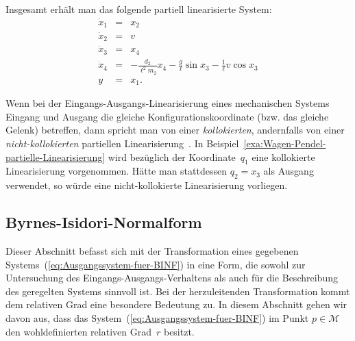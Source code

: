 \begin{example}
Insgesamt erhält man das folgende partiell linearisierte System\foreignlanguage{english}{:}
\begin{equation}
\begin{array}{lcl}
\dot{x}_{1} & = & x_{2}\\
\dot{x}_{2} & = & v\\
\dot{x}_{3} & = & x_{4}\\
\dot{x}_{4} & = & -\frac{d_{2}}{\ell^{2}m_{2}}x_{4}-\frac{g}{\ell}\sin x_{3}-\frac{1}{\ell}v\cos x_{3}\\
y & = & x_{1}.
\end{array}\label{eq:wagen-pendel-kollokiert-linearisiert}
\end{equation}
\end{example}

Wenn bei der Eingangs-Ausgangs-Linearisierung eines mechanischen Systems
Eingang und Ausgang die gleiche Konfigurationskoordinate (bzw. das
gleiche Gelenk) betreffen, dann spricht man von einer \emph{kollokierten},
andernfalls von einer \emph{nicht-kollokierten} partiellen Linearisierung~\cite{spong1994,spong1998}.
In Beispiel~\ref{exa:Wagen-Pendel-partielle-Linearisierung} wird
bezüglich der Koordinate~$q_{1}$ eine kollokierte Linearisierung
vorgenommen. Hätte man stattdessen $q_{2}=x_{3}$ als Ausgang verwendet,
so würde eine nicht-kollokierte Linearisierung vorliegen.

\subsection{Byrnes-Isidori-Normalform\label{subsec:Byrnes-Isidori-Normalform}}

Dieser Abschnitt befasst sich mit der Transformation eines gegebenen
Systems~(\ref{eq:Ausgangssystem-fuer-BINF}) in eine Form, die sowohl
zur Untersuchung des Eingangs-Ausgangs-Verhaltens als auch für die
Beschreibung des geregelten Systems sinnvoll ist. Bei der herzuleitenden
Transformation kommt dem relativen Grad eine besondere Bedeutung zu.
In diesem Abschnitt gehen wir davon aus, dass das System~(\ref{eq:Ausgangssystem-fuer-BINF})
im Punkt $p\in\mathcal{M}$ den wohldefinierten relativen Grad~$r$
besitzt. 

